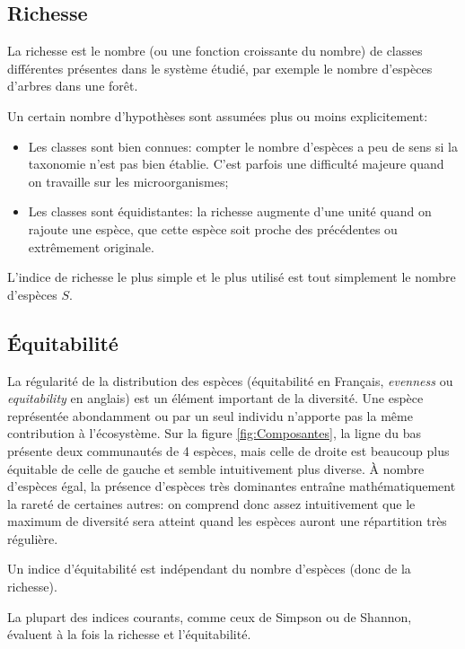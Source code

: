 \documentclass[
  11pt,
  french,
  a4paper,
  extrafontsizes,onecolumn,openright
  ]{memoir}
\providecommand{\tightlist}{%
  \setlength{\itemsep}{0pt}\setlength{\parskip}{0pt}}
\newlength{\rf}
\begin{document}
\hypertarget{richesse}{%
\subsection{Richesse}\label{richesse}}

La richesse \autocite[terme introduit par][]{Mcintosh1967} est le nombre (ou une fonction croissante du nombre) de classes différentes présentes dans le système étudié, par exemple le nombre d'espèces d'arbres dans une forêt.

Un certain nombre d'hypothèses sont assumées plus ou moins explicitement:

\begin{itemize}
\tightlist
\item
  Les classes sont bien connues: compter le nombre d'espèces a peu de sens si la taxonomie n'est pas bien établie.
  C'est parfois une difficulté majeure quand on travaille sur les microorganismes;
\item
  Les classes sont équidistantes: la richesse augmente d'une unité quand on rajoute une espèce, que cette espèce soit proche des précédentes ou extrêmement originale.
\end{itemize}

L'indice de richesse le plus simple et le plus utilisé est tout simplement le nombre d'espèces \(S\).

\hypertarget{uxe9quitabilituxe9}{%
\subsection{Équitabilité}\label{uxe9quitabilituxe9}}

La régularité de la distribution des espèces (équitabilité en Français, \emph{evenness} ou \emph{equitability} en anglais) est un élément important de la diversité.
Une espèce représentée abondamment ou par un seul individu n'apporte pas la même contribution à l'écosystème.
Sur la figure \ref{fig:Composantes}, la ligne du bas présente deux communautés de 4 espèces, mais celle de droite est beaucoup plus équitable de celle de gauche et semble intuitivement plus diverse.
À nombre d'espèces égal, la présence d'espèces très dominantes entraîne mathématiquement la rareté de certaines autres: on comprend donc assez intuitivement que le maximum de diversité sera atteint quand les espèces auront une répartition très régulière.

Un indice d'équitabilité est indépendant du nombre d'espèces (donc de la richesse).

La plupart des indices courants, comme ceux de Simpson ou de Shannon, évaluent à la fois la richesse et l'équitabilité.
\end{document}
